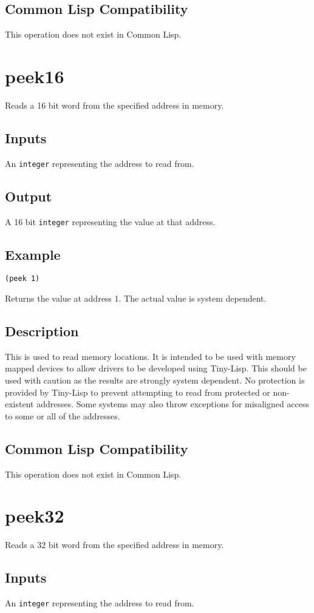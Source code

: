\documentclass[10pt, openany]{book}
\newcommand{\datatype}[1]{\texttt{#1}}
\newcommand{\tl}{Tiny-Lisp}
\newcommand{\cl}{Common Lisp}
\begin{document}
\subsection{Common Lisp Compatibility}
This operation does not exist in \cl.

\section{peek16}
Reads a 16 bit word from the specified address in memory.
\subsection{Inputs}
An \datatype{integer} representing the address to read from.
\subsection{Output}
A 16 bit \datatype{integer} representing the value at that address.
\subsection{Example}
\begin{lstlisting}
(peek 1)
\end{lstlisting}
Returns the value at address 1.  The actual value is system dependent.
\subsection{Description}
This is used to read memory locations.  It is intended to be used with memory mapped devices to allow drivers to be developed using \tl{}.  This should be used with caution as the results are strongly system dependent.  No protection is provided by \tl{} to prevent attempting to read from protected or non-existent addresses.  Some systems may also throw exceptions for misaligned access to some or all of the addresses.
\subsection{Common Lisp Compatibility}
This operation does not exist in \cl.

\section{peek32}
Reads a 32 bit word from the specified address in memory.
\subsection{Inputs}
An \datatype{integer} representing the address to read from.
\end{document}
